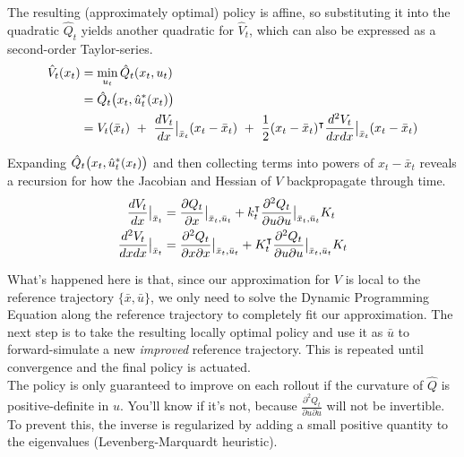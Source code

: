 \documentclass{article}
\DeclareMathOperator*{\tr}{\intercal}
\begin{document}
The resulting (approximately optimal) policy is affine, so substituting it into the quadratic $\hat{Q}_t$ yields another quadratic for $\hat{V}_t$, which can also be expressed as a second-order Taylor-series.
\begin{align*}
\hat{V}_t(x_t) &= \min_{u_t} \hat{Q}_t(x_t,u_t)\\
&= \hat{Q}_t\big{(}x_t,\hat{u}^*_t(x_t)\big{)}\\
&= V_t(\bar{x}_t)\ +\ \frac{dV_t}{dx}\big{|}_{\bar{x}_t}(x_t - \bar{x}_t)\ +\ \frac{1}{2}(x_t - \bar{x}_t)^{\tr}\frac{d^2V_t}{dxdx}\big{|}_{\bar{x}_t}(x_t - \bar{x}_t)
\end{align*}

Expanding $\hat{Q}_t\big{(}x_t,\hat{u}^*_t(x_t)\big{)}$ and then collecting terms into powers of $x_t - \bar{x}_t$ reveals a recursion for how the Jacobian and Hessian of $V$ backpropagate through time.
\begin{align*}
\frac{dV_t}{dx}\big{|}_{\bar{x}_t} &= \frac{\partial Q_t}{\partial x}\big{|}_{\tiny{\bar{x}_t,\bar{u}_t}} + k_t^{\tr} \frac{\partial^2 Q_t}{\partial u \partial u}\big{|}_{\tiny{\bar{x}_t,\bar{u}_t}} K_t\\
\frac{d^2V_t}{dxdx}\big{|}_{\bar{x}_t} &= \frac{\partial^2 Q_t}{\partial x \partial x}\big{|}_{\tiny{\bar{x}_t,\bar{u}_t}} + K_t^{\tr} \frac{\partial^2 Q_t}{\partial u \partial u}\big{|}_{\tiny{\bar{x}_t,\bar{u}_t}} K_t
\end{align*}

What's happened here is that, since our approximation for $V$ is local to the reference trajectory $\{\bar{x}, \bar{u}\}$, we only need to solve the Dynamic Programming Equation along the reference trajectory to completely fit our approximation. The next step is to take the resulting locally optimal policy and use it as $\bar{u}$ to forward-simulate a new \textit{improved} reference trajectory. This is repeated until convergence and the final policy is actuated.\\

The policy is only guaranteed to improve on each rollout if the curvature of $\hat{Q}$ is positive-definite in $u$. You'll know if it's not, because $\frac{\partial^2 Q_t}{\partial u \partial u}$ will not be invertible. To prevent this, the inverse is regularized by adding a small positive quantity to the eigenvalues (Levenberg-Marquardt heuristic).

\end{document}
